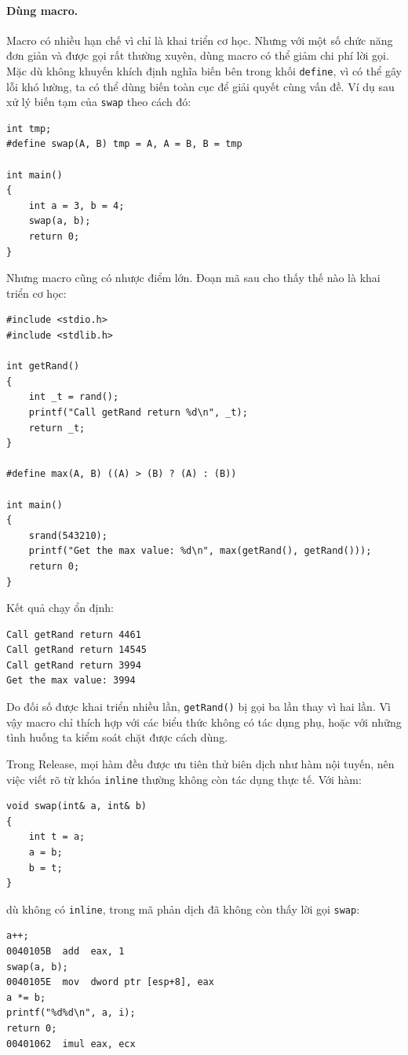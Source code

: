 \documentclass[11pt]{article}
\begin{document}
\paragraph{Dùng macro.}
Macro có nhiều hạn chế vì chỉ là khai triển cơ học. Nhưng với một số chức năng
đơn giản và được gọi rất thường xuyên, dùng macro có thể giảm chi phí lời gọi.
Mặc dù không khuyến khích định nghĩa biến bên trong khối \texttt{define}, vì
có thể gây lỗi khó lường, ta có thể dùng biến toàn cục để giải quyết cùng vấn
đề. Ví dụ sau xử lý biến tạm của \texttt{swap} theo cách đó:
\begin{verbatim}
int tmp;
#define swap(A, B) tmp = A, A = B, B = tmp

int main()
{
    int a = 3, b = 4;
    swap(a, b);
    return 0;
}
\end{verbatim}

Nhưng macro cũng có nhược điểm lớn. Đoạn mã sau cho thấy thế nào là khai triển
cơ học:
\begin{verbatim}
#include <stdio.h>
#include <stdlib.h>

int getRand()
{
    int _t = rand();
    printf("Call getRand return %d\n", _t);
    return _t;
}

#define max(A, B) ((A) > (B) ? (A) : (B))

int main()
{
    srand(543210);
    printf("Get the max value: %d\n", max(getRand(), getRand()));
    return 0;
}
\end{verbatim}

Kết quả chạy ổn định:
\begin{verbatim}
Call getRand return 4461
Call getRand return 14545
Call getRand return 3994
Get the max value: 3994
\end{verbatim}

Do đối số được khai triển nhiều lần, \texttt{getRand()} bị gọi ba lần thay vì
hai lần. Vì vậy macro chỉ thích hợp với các biểu thức không có tác dụng phụ,
hoặc với những tình huống ta kiểm soát chặt được cách dùng.

Trong Release, mọi hàm đều được ưu tiên thử biên dịch như hàm nội tuyến, nên
việc viết rõ từ khóa \texttt{inline} thường không còn tác dụng thực tế. Với
hàm:
\begin{verbatim}
void swap(int& a, int& b)
{
    int t = a;
    a = b;
    b = t;
}
\end{verbatim}
dù không có \texttt{inline}, trong mã phản dịch đã không còn thấy lời gọi
\texttt{swap}:
\begin{verbatim}
a++;
0040105B  add  eax, 1
swap(a, b);
0040105E  mov  dword ptr [esp+8], eax
a *= b;
printf("%d%d\n", a, i);
return 0;
00401062  imul eax, ecx
\end{verbatim}
\end{document}
